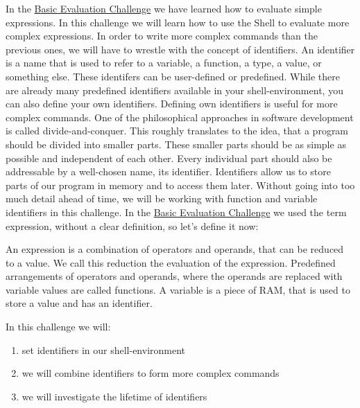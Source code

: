 \begin{challenge}
    \begin{chadescription}
        In the \href{https://github.com/STEMgraph/ac584d6d-1397-49d9-8319-85e9fbd4b765}{Basic Evaluation Challenge} we have learned how to evaluate simple expressions.
        In this challenge we will learn how to use the Shell to evaluate more complex expressions.
        In order to write more complex commands than the previous ones, we will have to wrestle with the concept of identifiers. 
        An identifier is a name that is used to refer to a variable, a function, a type, a value, or something else.
        These identifers can be user-defined or predefined.
        While there are already many predefined identifiers available in your shell-environment, you can also define your own identifiers.
        Defining own identifiers is useful for more complex commands.
        One of the philosophical approaches in software development is called divide-and-conquer.
        This roughly translates to the idea, that a program should be divided into smaller parts.
        These smaller parts should be as simple as possible and independent of each other.
        Every individual part should also be addressable by a well-chosen name, its identifier.
        Identifiers allow us to store parts of our program in memory and to access them later.
        Without going into too much detail ahead of time, we will be working with function and variable identifiers in this challenge.
        In the \href{https://github.com/STEMgraph/ac584d6d-1397-49d9-8319-85e9fbd4b765}{Basic Evaluation Challenge} we used the term expression, without a clear definition, so let's define it now:
        \begin{definition}
            An expression is a combination of operators and operands, that can be reduced to a value. 
            We call this reduction the evaluation of the expression.
            Predefined arrangements of operators and operands, where the operands are replaced with variable values are called functions.
            A variable is a piece of RAM, that is used to store a value and has an identifier.
        \end{definition}

        In this challenge we will: 
        \begin{enumerate}
            \item set identifiers in our shell-environment
            \item we will combine identifiers to form more complex commands
            \item we will investigate the lifetime of identifiers
        \end{enumerate}
    \end{chadescription}


\end{challenge}
